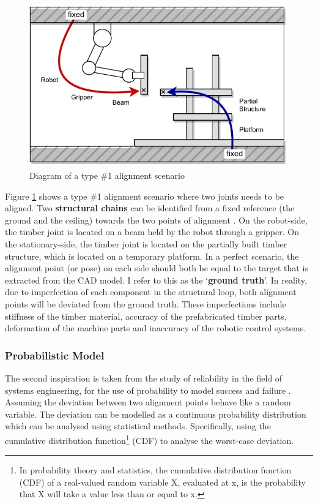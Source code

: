 \begin{figure}[ht]
    \centering
    \includegraphics[width=0.99\textwidth]{images/09/Alignment Error Two Kinematic Chain.pdf}
    \caption{Diagram of a type \#1 alignment scenario}
    \label{fig:type-1-alignment-scenario}
\end{figure}

Figure \ref{fig:type-1-alignment-scenario} shows a type \#1 alignment scenario where two joints needs to be aligned. Two \textbf{structural chains} can be identified from a fixed reference (the ground and the ceiling) towards the two points of alignment \parencite{slocumPrecisionMachineDesign1992}. On the robot-side, the timber joint is located on a beam held by the robot through a gripper. On the stationary-side, the timber joint is located on the partially built timber structure, which is located on a temporary platform. In a perfect scenario, the alignment point (or pose) on each side should both be equal to the target that is extracted from the CAD model. I refer to this as the ‘\textbf{ground truth}’. In reality, due to imperfection of each component in the structural loop, both alignment points will be deviated from the ground truth. These imperfections include stiffness of the timber material, accuracy of the prefabricated timber parts, deformation of the machine parts and inaccuracy of the robotic control systems. 

\subsubsection{Probabilistic Model}
\label{subsubsection:probabilistic-model}

The second inspiration is taken from the study of reliability in the field of systems engineering, for the use of probability to model success and failure \parencite{hallmannToleranceAllocationTolerancecost2020}. Assuming the deviation between two alignment points behave like a random variable. The deviation can be modelled as a continuous probability distribution which can be analysed using statistical methods. Specifically, using the cumulative distribution function\footnote{ In probability theory and statistics, the cumulative distribution function (CDF) of a real-valued random variable X, evaluated at x, is the probability that X will take a value less than or equal to x. } (CDF) to analyse the worst-case deviation.

